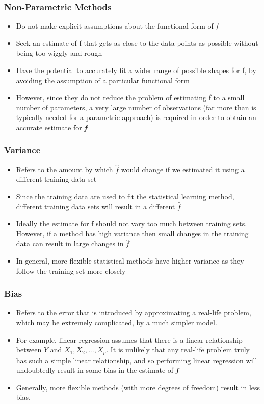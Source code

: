 \documentclass[12]{beamer}
\begin{document}
%
%
\begin{frame}
\frametitle{Non-Parametric Methods}
\begin{itemize}
\addtolength{\itemsep}{10pt}
\item Do not make explicit assumptions about the functional form of \textit{f}
\item Seek an estimate of f that gets as close to the data points as possible without being too wiggly and rough
\item Have the potential to accurately fit a wider range of possible shapes for f, by avoiding the assumption of a particular functional form
\item However, since they do not reduce the problem of estimating f to a small number of parameters, a very large number of observations (far more than is typically needed for a parametric approach) is required in order to obtain an accurate estimate for \textit{\textbf{f}}
\end{itemize}
\end{frame}

%
%
\begin{frame}
\frametitle{Variance}
\begin{itemize}
\addtolength{\itemsep}{10pt}
\item Refers to the amount by which $\hat{f}$ would change if we estimated it using a different training data set
\item Since the training data are used to fit the statistical learning method, different training data sets will result in a different $\hat{f}$
\item Ideally the estimate for f should not vary too much between training sets. However, if a method has high variance then small changes in the training data can result in large changes in $\hat{f}$
\item In general, more flexible statistical methods have higher variance as they follow the training set more closely
\end{itemize}
\end{frame}

%
%
\begin{frame}
\frametitle{Bias}
\begin{itemize}
\addtolength{\itemsep}{10pt}
\item Refers to the error that is introduced by approximating a real-life problem, which may be extremely complicated, by a much
simpler model.
\item For example, linear regression assumes that there is a linear relationship between $Y$ and $X_{1}, X_{2}, . . . , X_{p}$. It is unlikely that any real-life problem truly has such a simple linear relationship, and so performing linear regression will undoubtedly result in some bias in the estimate of \textit{\textbf{f}}
\item Generally, more flexible methods (with more degrees of freedom) result in less bias.
\end{itemize}
\end{frame}
\end{document}
